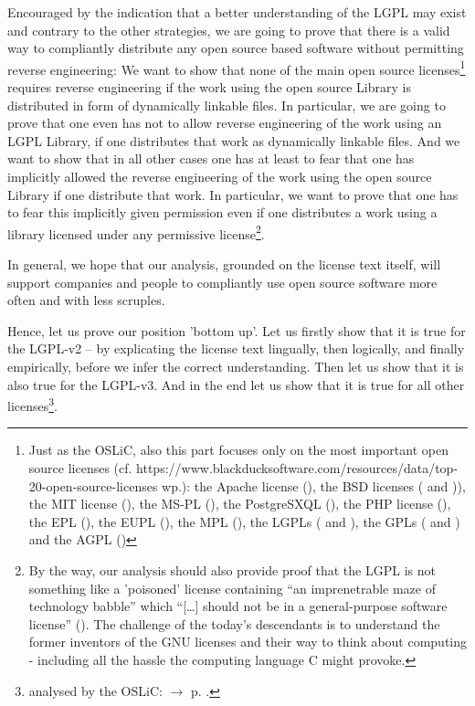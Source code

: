 \label{RevEngOslicOsLisences}
Encouraged by the indication that a better understanding of the LGPL may exist
and contrary to the other strategies, we are going to prove that there is a
valid way to compliantly distribute any open source based software without
permitting reverse engineering: We want to show that none of the main open
source licenses\footnote{Just as the OSLiC, also this part focuses only on the
most important open source licenses (cf.
https://www.blackducksoftware.com/resources/data/top-20-open-source-licenses
wp.): the Apache license (\cite[cf.][\nopage wp.]{Apl20OsiLicense2004a}), the
BSD licenses (\cite[cf.][\nopage wp.]{BsdLicense3Clause} and \cite[cf.][\nopage
wp.]{BsdLicense2Clause})), the MIT license (\cite[cf.][\nopage
wp.]{MitLicense2012a}), the MS-PL (\cite[cf.][\nopage
wp.]{MsplOsiLicense2013a}), the PostgreSXQL (\cite[cf.][\nopage
wp.]{PglOsiLicense2013a}), the PHP license (\cite[cf.][\nopage
wp.]{Php30OsiLicense2013a}), the EPL (\cite[cf.][\nopage
wp.]{Epl10OsiLicense2005a}), the EUPL (\cite[cf.][\nopage
wp.]{Eupl11OsiLicense2007a}), the MPL (\cite[cf.][\nopage
wp.]{Mpl20OsiLicense2013a}), the LGPLs (\cite[cf.][\nopage
wp.]{Lgpl21OsiLicense1999a} and \cite[cf.][\nopage wp.]{Lgpl30OsiLicense2007a}),
the GPLs (\cite[cf.][\nopage wp.]{Gpl20OsiLicense1991a} and \cite[cf.][\nopage
wp.]{Gpl30OsiLicense2007a}) and the AGPL (\cite[cf.][\nopage
wp.]{Agpl30OsiLicense2007a})} requires reverse engineering if the work using
the open source Library is distributed in form of dynamically linkable files. In
particular, we are going to prove that one even has not to allow reverse
engineering of the work using an LGPL Library, if one distributes that work as
dynamically linkable files. And we want to show that in all other cases one has
at least to fear that one has implicitly allowed the reverse engineering of the
work using the open source Library if one distribute that work. In particular,
we want to prove that one has to fear this implicitly given permission even if
one distributes a work using a library licensed under any permissive
license\footnote{By the way, our analysis should also provide proof that the
LGPL is not something like a 'poisoned' license containing \enquote{an
imprenetrable maze of technology babble} which \enquote{[\ldots] should not be
in a general-purpose software license} (\cite[cf.][124]{Rosen2005a}). The
challenge of the today's descendants is to understand the former inventors of
the GNU licenses and their way to think about computing - including all the
hassle the computing language C might provoke.}.

In general, we hope that our analysis, grounded on the license text itself, will
support companies and people to compliantly use open source software more often
and with less scruples.

Hence, let us prove our position 'bottom up'. Let us firstly show that it is
true for the LGPL-v2 -- by explicating the license text lingually, then
logically, and finally empirically, before we infer the correct understanding.
Then let us show that it is also true for the LGPL-v3. And in the end let us
show that it is true for all other licenses\footnote{analysed by the OSLiC:
$\rightarrow$ p. \pageref{RevEngOslicOsLisences}.}.

